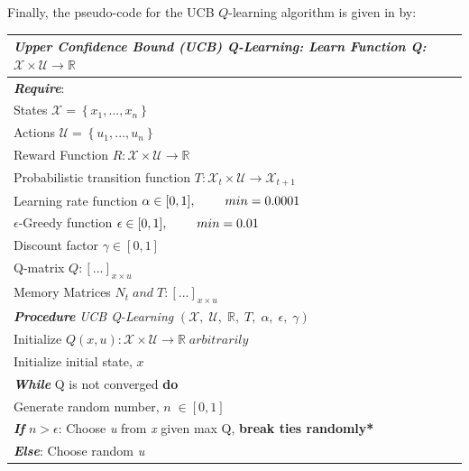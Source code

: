 Finally, the pseudo-code for the UCB $Q$-learning algorithm is given in by:
\begin{table}[h]
	\def\arraystretch{1.2}
	\begin{tabular}{p{15cm}}
	\hline
	\emph{Upper Confidence Bound (UCB) Q-Learning: Learn Function Q: $\mathcal{X} \times \mathcal{U} \rightarrow \mathbb{R}$} \\ \hline
	\textbf{\emph{Require}}: \\
		States $\mathcal{X} = \left\{ x_1, ..., x_n \right\}$ \\
		Actions $\mathcal{U} = \left\{u_1, ..., u_n \right\}$ \\
		Reward Function $R: \mathcal{X} \times \mathcal{U} \rightarrow \mathbb{R}$ \\
		Probabilistic transition function $T: \mathcal{X}_t \times \mathcal{U} \rightarrow \mathcal{X}_{t+1}$ \\
		Learning rate function $\alpha \in [0, 1], \hspace{0.8cm} min = 0.0001$ \\
		$\epsilon$-Greedy function $\epsilon \in [0, 1], \hspace{0.8cm} min = 0.01$ \\
		Discount factor $\gamma \in [0, 1]$ \\
		Q-matrix $Q:[...]_{x \times u}$ \\
		Memory Matrices $N_t \; and \; T : [...]_{x \times u}$ \\
		\textbf{\emph{Procedure}} \emph{UCB Q-Learning} $(\mathcal{X},\; \mathcal{U},\; \mathbb{R},\; T,\; \alpha,\; \epsilon,\; \gamma)$ \\
		\hspace{1cm}  Initialize $Q(x, u): \mathcal{X} \times \mathcal{U} \rightarrow \mathbb{R} \; arbitrarily$ \\
		\hspace{1cm} Initialize initial state, $x$ \\
		\hspace{1cm} \textbf{\emph{While}} Q is not converged \textbf{do} \\
		\hspace{2cm} Generate random number, $n \; \in [0, 1]$ \\
		\hspace{2cm} \textbf{\emph{If}} $n > \epsilon$: Choose \emph{u} from \emph{x} given max Q, \textbf{break ties randomly*} \\
		\hspace{2cm} \textbf{\emph{Else}}: Choose random \emph{u} \\

\end{tabular}
\end{table}
